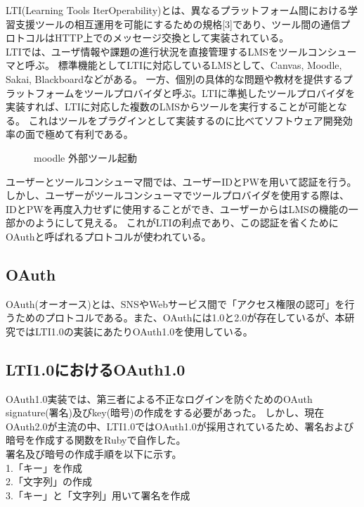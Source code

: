 \label{tag:LTI}
LTI(Learning Tools IterOperability)とは、異なるプラットフォーム間における学習支援ツールの相互運用を可能にするための規格[3]であり、ツール間の通信プロトコルはHTTP上でのメッセージ交換として実装されている。\\

LTIでは、ユーザ情報や課題の進行状況を直接管理するLMSをツールコンシューマと呼ぶ。
標準機能としてLTIに対応しているLMSとして、Canvas, Moodle, Sakai, Blackboardなどがある。
一方、個別の具体的な問題や教材を提供するプラットフォームをツールプロバイダと呼ぶ。LTIに準拠したツールプロバイダを実装すれば、LTIに対応した複数のLMSからツールを実行することが可能となる。
これはツールをプラグインとして実装するのに比べてソフトウェア開発効率の面で極めて有利である。\\
\begin{figure}[htbp]
  \begin{center}
    \caption{moodle 外部ツール起動}
    \label{fig:moodle kidou}
  \end{center}
\end{figure}
ユーザーとツールコンシューマ間では、ユーザーIDとPWを用いて認証を行う。しかし、ユーザーがツールコンシューマでツールプロバイダを使用する際は、IDとPWを再度入力せずに使用することができ、ユーザーからはLMSの機能の一部かのようにして見える。
これがLTIの利点であり、この認証を省くためにOAuthと呼ばれるプロトコルが使われている。
\subsection{OAuth}
OAuth(オーオース)とは、SNSやWebサービス間で「アクセス権限の認可」を行うためのプロトコルである。また、OAuthには1.0と2.0が存在しているが、本研究ではLTI1.0の実装にあたりOAuth1.0を使用している。
\subsection{LTI1.0におけるOAuth1.0}
OAuth1.0実装では、第三者による不正なログインを防ぐためのOAuth signature(署名)及びkey(暗号)の作成をする必要があった。
しかし、現在OAuth2.0が主流の中、LTI1.0ではOAuth1.0が採用されているため、署名および暗号を作成する関数をRubyで自作した。\\
署名及び暗号の作成手順を以下に示す。\\
1.「キー」を作成\\
2.「文字列」の作成\\
3.「キー」と「文字列」用いて署名を作成\\
